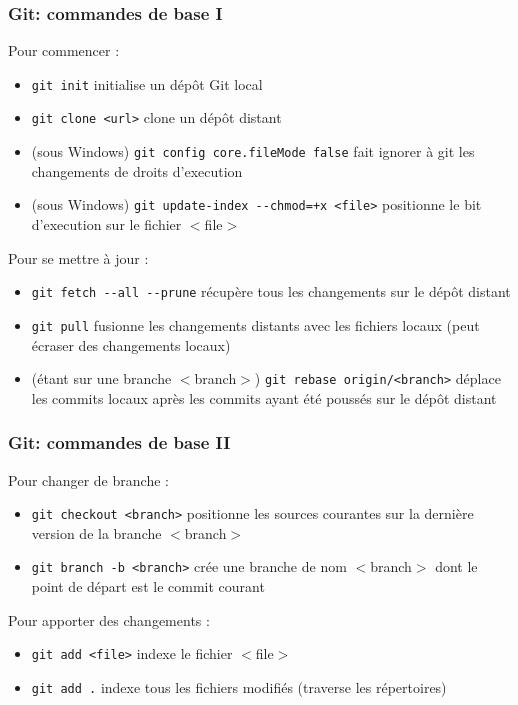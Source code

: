 \begin{frame}
	\frametitle{Git: commandes de base I}
	Pour commencer :
    \begin{itemize}
      \item {\lstinline[basicstyle=\ttfamily\color{blue}]|git init|} initialise un d\'ep\^{o}t Git local
      \item {\lstinline[basicstyle=\ttfamily\color{blue}]|git clone <url>|} clone un d\'ep\^{o}t distant
	  \item (sous Windows) {\lstinline[basicstyle=\ttfamily\color{blue}]|git config core.fileMode false|} fait ignorer \`a git les changements de droits d'execution
	  \item (sous Windows) {\lstinline[basicstyle=\ttfamily\color{blue}]|git update-index --chmod=+x <file>|} positionne le bit d'execution sur le fichier $<$file$>$
    \end{itemize}
	Pour se mettre \`a jour :
	\begin{itemize}
      \item {\lstinline[basicstyle=\ttfamily\color{blue}]|git fetch --all --prune|} r\'ecup\`ere tous les changements sur le d\'ep\^{o}t distant
      \item {\lstinline[basicstyle=\ttfamily\color{blue}]|git pull|} fusionne les changements distants avec les fichiers locaux (peut \'ecraser des changements locaux)
	  \item (\'etant sur une branche $<$branch$>$) {\lstinline[basicstyle=\ttfamily\color{blue}]|git rebase origin/<branch>|} d\'eplace les commits locaux apr\`es les commits ayant \'et\'e pouss\'es sur le d\'ep\^{o}t distant
    \end{itemize}
\end{frame}

\begin{frame}
	\frametitle{Git: commandes de base II}
	Pour changer de branche :
	\begin{itemize}
      \item {\lstinline[basicstyle=\ttfamily\color{blue}]|git checkout <branch>|} positionne les sources courantes sur la derni\`ere version de la branche $<$branch$>$
      \item {\lstinline[basicstyle=\ttfamily\color{blue}]|git branch -b <branch>|} cr\'ee une branche de nom $<$branch$>$ dont le point de d\'epart est le commit courant
    \end{itemize}
	Pour apporter des changements :
	\begin{itemize}
      \item {\lstinline[basicstyle=\ttfamily\color{blue}]|git add <file>|} indexe le fichier $<$file$>$
      \item {\lstinline[basicstyle=\ttfamily\color{blue}]|git add .|} indexe tous les fichiers modifi\'es (traverse les r\'epertoires)
    \end{itemize}
\end{frame}

